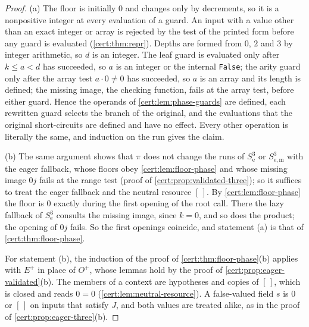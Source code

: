 \begin{proof}
(a) The floor is initially $0$ and changes only by decrements, so it is a nonpositive
integer at every evaluation of a guard. An input with a value other than an exact
integer or array is rejected by the test of the printed form before any guard is
evaluated (\cref{cert:thm:repr}). Depths are formed from $0$, $2$ and $3$ by integer
arithmetic, so $d$ is an integer. The leaf guard is evaluated only after $k\le a<d$ has
succeeded, so $a$ is an integer or the internal \texttt{False}; the arity guard only
after the array test $a\cdot 0\neq 0$ has succeeded, so $a$ is an array and its length
is defined; the missing image, the checking function, fails at the array test, before
either guard. Hence the operands of \cref{cert:lem:phase-guards} are defined, each
rewritten guard selects the branch of the original, and the evaluations that the
original short-circuits are defined and have no effect. Every other operation is
literally the same, and induction on the run gives the claim.

(b) The same argument shows that $\pi$ does not change the runs of $S^{3}_{\mathrm e}$ or
$S^{3}_{\mathrm{e,m}}$ with the eager fallback, whose floors obey
\cref{cert:lem:floor-phase} and whose missing image $0j$ fails at the range test (proof of
\cref{cert:prop:validated-three}); so it suffices to treat the eager fallback and the
neutral resource $[\,]$. By \cref{cert:lem:floor-phase} the floor is $0$ exactly during
the first opening of the root call. There the lazy fallback of $S^{3}_{\mathrm e}$
consults the missing image, since $k=0$, and so does the product; the opening of $0j$
fails. So the first openings coincide, and statement (a) is that of
\cref{cert:thm:floor-phase}.

For statement (b), the induction of the proof of \cref{cert:thm:floor-phase}(b) applies
with $E^{+}$ in place of $O^{+}$, whose lemmas hold by the proof of
\cref{cert:prop:eager-validated}(b). The members of a context are hypotheses and copies
of $[\,]$, which is closed and reads $0=0$ (\cref{cert:lem:neutral-resource}). A
false-valued field $s$ is $0$ or $[\,]$ on inputs that satisfy $J$, and both values are
treated alike, as in the proof of \cref{cert:prop:eager-three}(b).


\end{proof}
